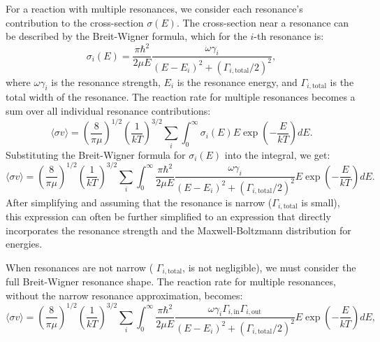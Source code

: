 \documentclass[a4paper,12pt]{article}
\begin{document}
For a reaction with multiple resonances, we consider each resonance's contribution to the cross-section \(\sigma(E)\). The cross-section near a resonance can be described by the Breit-Wigner formula, which for the \(i\)-th resonance is:
\begin{equation}
\sigma_i(E) = \frac{\pi \hbar^2}{2 \mu E} \frac{\omega \gamma_i}{(E - E_i)^2 + (\Gamma_{i,\text{total}}/2)^2},
\end{equation}
where \(\omega \gamma_i\) is the resonance strength, \(E_i\) is the resonance energy, and \(\Gamma_{i,\text{total}}\) is the total width of the resonance. The reaction rate for multiple resonances becomes a sum over all individual resonance contributions:
\begin{equation}
\langle \sigma v \rangle = \left( \frac{8}{\pi \mu} \right)^{1/2} \left( \frac{1}{kT} \right)^{3/2} \sum_i \int_0^\infty \sigma_i(E) E \exp \left( -\frac{E}{kT} \right) dE.
\end{equation}
Substituting the Breit-Wigner formula for \(\sigma_i(E)\) into the integral, we get:
\begin{equation}
\langle \sigma v \rangle = \left( \frac{8}{\pi \mu} \right)^{1/2} \left( \frac{1}{kT} \right)^{3/2} \sum_i \int_0^\infty \frac{\pi \hbar^2}{2 \mu E} \frac{\omega \gamma_i}{(E - E_i)^2 + (\Gamma_{i,\text{total}}/2)^2} E \exp \left( -\frac{E}{kT} \right) dE.
\end{equation}
After simplifying and assuming that the resonance is narrow (\(\Gamma_{i,\text{total}}\) is small), this expression can often be further simplified to an expression that directly incorporates the resonance strength and the Maxwell-Boltzmann distribution for energies.

When resonances are not narrow ( \(\Gamma_{i,\text{total}}\), is not negligible), we must consider the full Breit-Wigner resonance shape. The reaction rate for multiple resonances, without the narrow resonance approximation, becomes:
\begin{equation}
\langle \sigma v \rangle = \left( \frac{8}{\pi \mu} \right)^{1/2} \left( \frac{1}{kT} \right)^{3/2} \sum_i \int_0^\infty \frac{\pi \hbar^2}{2 \mu E} \frac{\omega \gamma_i \Gamma_{i,\text{in}}\Gamma_{i,\text{out}}}{(E - E_i)^2 + (\Gamma_{i,\text{total}}/2)^2} E \exp \left( -\frac{E}{kT} \right) dE,
\end{equation}
\end{document}
